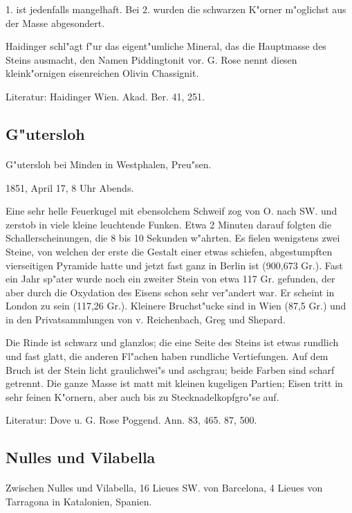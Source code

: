 \documentclass[a4paper, 11pt, oneside]{article}
\begin{document}
1. ist jedenfalls mangelhaft. Bei 2. wurden die schwarzen K"orner m"oglichst aus der Masse abgesondert.

Haidinger schl"agt f"ur das eigent"umliche Mineral, das die Hauptmasse des Steins ausmacht, den Namen Piddingtonit vor. G. Rose nennt diesen kleink"ornigen eisenreichen Olivin Chassignit.

\footnotesize
Literatur: Haidinger Wien. Akad. Ber. 41, 251.

\subsection{G"utersloh}
\normalsize
\paragraph{}
G"utersloh bei Minden in Westphalen, Preu"sen.

1851, April 17, 8 Uhr Abends.

Eine sehr helle Feuerkugel mit ebensolchem Schweif zog von O. nach SW. und zerstob in viele kleine leuchtende Funken. Etwa 2 Minuten darauf folgten die Schallerscheinungen, die 8 bis 10 Sekunden w"ahrten. Es fielen wenigstens zwei Steine, von welchen der erste die Gestalt einer etwas schiefen, abgestumpften vierseitigen Pyramide hatte und jetzt fast ganz in Berlin ist (900,673 Gr.). Fast ein Jahr sp"ater wurde noch ein zweiter Stein von etwa 117 Gr. gefunden, der aber durch die Oxydation des Eisens schon sehr ver"andert war. Er scheint in London zu sein (117,26 Gr.). Kleinere Bruchst"ucke sind in Wien (87,5 Gr.) und in den Privatsammlungen von v. Reichenbach, Greg und Shepard.

Die Rinde ist schwarz und glanzlos; die eine Seite des Steins ist etwas rundlich und fast glatt, die anderen Fl"achen haben rundliche Vertiefungen. Auf dem Bruch ist der Stein licht graulichwei"s und aschgrau; beide Farben sind scharf getrennt. Die ganze Masse ist matt mit kleinen kugeligen Partien; Eisen tritt in sehr feinen K"ornern, aber auch bis zu Stecknadelkopfgro"se auf.

\footnotesize
Literatur: Dove u. G. Rose Poggend. Ann. 83, 465. 87, 500.

\subsection{Nulles und Vilabella}
\normalsize
\paragraph{}
Zwischen Nulles und Vilabella, 16 Lieues SW. von Barcelona, 4 Lieues von Tarragona in Katalonien, Spanien.
\end{document}
